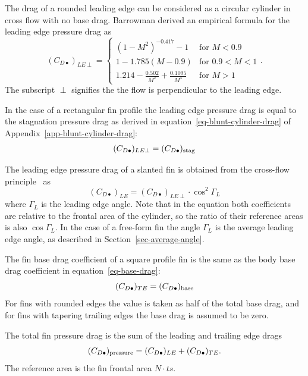 The drag of a rounded leading edge can be considered as a circular
cylinder in cross flow with no base drag.  Barrowman derived 
an empirical formula for the leading edge pressure drag as
%
\begin{equation}
(C_{D\bullet})_{LE\perp} = 
\left\{ 
\begin{array}{ll}
  (1-M^2)^{-0.417} - 1 & \mbox{for $M<0.9$} \\
  1-1.785(M-0.9)         & \mbox{for $0.9 < M < 1$} \\
  1.214 - \frac{0.502}{M^2} + \frac{0.1095}{M^4} & \mbox{for $M>1$}
\end{array}
  \right. .
\end{equation}
%
The subscript $\perp$ signifies the the flow is perpendicular to the
leading edge.

In the case of a rectangular fin profile the leading edge pressure
drag is equal to the stagnation pressure drag as derived in 
equation~\ref{eq-blunt-cylinder-drag} of
Appendix~\ref{app-blunt-cylinder-drag}:
\begin{equation}
(C_{D\bullet})_{LE\perp} = (C_{D\bullet})_{\rm stag}
\end{equation}

The leading edge pressure drag of a slanted fin is obtained from the
cross-flow principle~\cite[p.~3-11]{hoerner} as
%
\begin{equation}
(C_{D\bullet})_{LE} = (C_{D\bullet})_{LE\perp} \cdot \cos^2\Gamma_L
\end{equation}
%
where $\Gamma_L$ is the leading edge angle.  Note that in the equation
both coefficients are relative to the frontal area of the cylinder, so
the ratio of their reference areas is also $\cos\Gamma_L$.  In the
case of a free-form fin the angle $\Gamma_L$ is the average leading
edge angle, as described in Section~\ref{sec-average-angle}.

The fin base drag coefficient of a square profile fin is the same as
the body base drag coefficient in equation~\ref{eq-base-drag}:
%
\begin{equation}
(C_{D\bullet})_{TE} = (C_{D\bullet})_{\rm base}
\end{equation}
%
For fins with rounded edges the value is taken as half of the total
base drag, and for fins with tapering trailing edges the base
drag is assumed to be zero.

The total fin pressure drag is the sum of the leading and trailing
edge drags
%
\begin{equation}
(C_{D\bullet})_{\rm pressure} = 
(C_{D\bullet})_{LE} + (C_{D\bullet})_{TE}.
\end{equation}
%
The reference area is the fin frontal area $N\cdot ts$.

